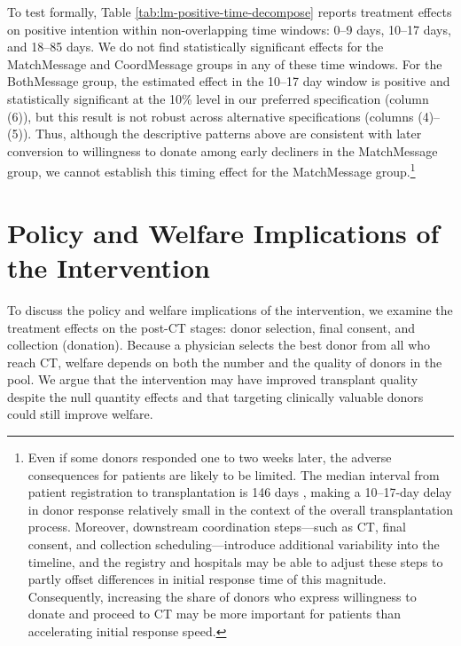 \documentclass[12pt, a4paper]{article}
\begin{document}
To test formally, Table \ref{tab:lm-positive-time-decompose} reports treatment effects on positive intention within non-overlapping time windows: 0--9 days, 10--17 days, and 18--85 days. We do not find statistically significant effects for the MatchMessage and CoordMessage groups in any of these time windows. For the BothMessage group, the estimated effect in the 10--17 day window is positive and statistically significant at the 10\% level in our preferred specification (column (6)), but this result is not robust across alternative specifications (columns (4)--(5)). Thus, although the descriptive patterns above are consistent with later conversion to willingness to donate among early decliners in the MatchMessage group, we cannot establish this timing effect for the MatchMessage group.\footnote{Even if some donors responded one to two weeks later, the adverse consequences for patients are likely to be limited. The median interval from patient registration to transplantation is 146 days \citep{Hirakawa2018}, making a 10--17-day delay in donor response relatively small in the context of the overall transplantation process. Moreover, downstream coordination steps---such as CT, final consent, and collection scheduling---introduce additional variability into the timeline, and the registry and hospitals may be able to adjust these steps to partly offset differences in initial response time of this magnitude. Consequently, increasing the share of donors who express willingness to donate and proceed to CT may be more important for patients than accelerating initial response speed.}

\hypertarget{discussion}{%
\section{Policy and Welfare Implications of the Intervention}\label{discussion}}

To discuss the policy and welfare implications of the intervention, we examine the treatment effects on the post-CT stages: donor selection, final consent, and collection (donation). Because a physician selects the best donor from all who reach CT, welfare depends on both the number and the quality of donors in the pool. We argue that the intervention may have improved transplant quality despite the null quantity effects and that targeting clinically valuable donors could still improve welfare.
\end{document}
